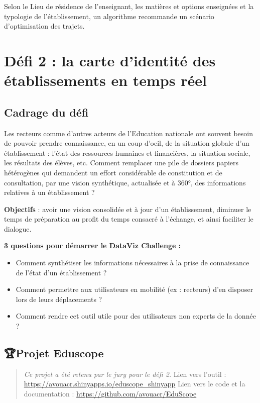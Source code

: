 \documentclass[]{book}
\providecommand{\tightlist}{%
  \setlength{\itemsep}{0pt}\setlength{\parskip}{0pt}}
\begin{document}
Selon le Lieu de résidence de l'enseignant, les matières et options
enseignées et la typologie de l'établissement, un algorithme recommande
un scénario d'optimisation des trajets.

\section{Défi 2 : la carte d'identité des établissements en temps
réel}\label{defi-2-la-carte-didentite-des-etablissements-en-temps-reel}

\subsection{Cadrage du défi}\label{cadrage-du-defi-1}

Les recteurs comme d'autres acteurs de l'Education nationale ont souvent
besoin de pouvoir prendre connaissance, en un coup d'oeil, de la
situation globale d'un établissement : l'état des ressources humaines et
financières, la situation sociale, les résultats des élèves, etc.
Comment remplacer une pile de dossiers papiers hétérogènes qui demandent
un effort considérable de constitution et de consultation, par une
vision synthétique, actualisée et à 360°, des informations relatives à
un établissement ?

\textbf{Objectifs} : avoir une vision consolidée et à jour d'un
établissement, diminuer le temps de préparation au profit du temps
consacré à l'échange, et ainsi faciliter le dialogue.

\textbf{3 questions pour démarrer le DataViz Challenge :}

\begin{itemize}
\tightlist
\item
  Comment synthétiser les informations nécessaires à la prise de
  connaissance de l'état d'un établissement ?
\item
  Comment permettre aux utilisateurs en mobilité (ex : recteurs) d'en
  disposer lors de leurs déplacements ?
\item
  Comment rendre cet outil utile pour des utilisateurs non experts de la
  donnée ?
\end{itemize}

\subsection{🏆Projet Eduscope}\label{projet-eduscope}

\begin{quote}
\emph{Ce projet a été retenu par le jury pour le défi 2.} Lien vers
l'outil : \url{https://avouacr.shinyapps.io/eduscope_shinyapp} Lien vers
le code et la documentation : \url{https://github.com/avouacr/EduScope}
\end{quote}
\end{document}
